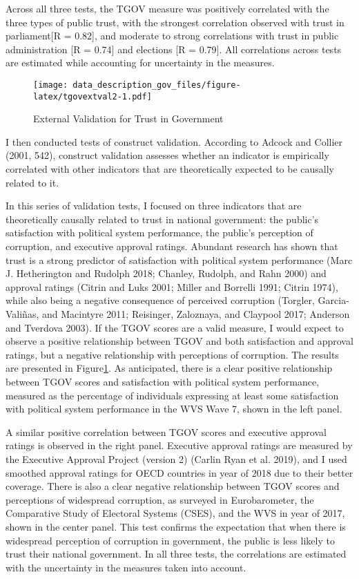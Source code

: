 \documentclass[
  12pt,
]{article}
\begin{document}
Across all three tests, the TGOV measure was positively correlated with the three types of public trust, with the strongest correlation observed with trust in parliament{[}R = 0.82{]}, and moderate to strong correlations with trust in public administration {[}R = 0.74{]} and elections {[}R = 0.79{]}.
All correlations across tests are estimated while accounting for uncertainty in the measures.

\begin{figure}
\centering
\texttt{[image: data\_description\_gov\_files/figure-latex/tgovextval2-1.pdf]}
\caption{\label{fig:tgovextval2}External Validation for Trust in Government \label{tgov_ev2}}
\end{figure}

I then conducted tests of construct validation.
According to Adcock and Collier (2001, 542), construct validation assesses whether an indicator is empirically correlated with other indicators that are theoretically expected to be causally related to it.

In this series of validation tests, I focused on three indicators that are theoretically causally related to trust in national government: the public's satisfaction with political system performance, the public's perception of corruption, and executive approval ratings.
Abundant research has shown that trust is a strong predictor of satisfaction with political system performance (Marc J. Hetherington and Rudolph 2018; Chanley, Rudolph, and Rahn 2000) and approval ratings (Citrin and Luks 2001; Miller and Borrelli 1991; Citrin 1974), while also being a negative consequence of perceived corruption (Torgler, Garcia-Valiñas, and Macintyre 2011; Reisinger, Zaloznaya, and Claypool 2017; Anderson and Tverdova 2003).
If the TGOV scores are a valid measure, I would expect to observe a positive relationship between TGOV and both satisfaction and approval ratings, but a negative relationship with perceptions of corruption.
The results are presented in Figure\nobreakspace{}\ref{tgov_ev2}.
As anticipated, there is a clear positive relationship between TGOV scores and satisfaction with political system performance, measured as the percentage of individuals expressing at least some satisfaction with political system performance in the WVS Wave 7, shown in the left panel.

A similar positive correlation between TGOV scores and executive approval ratings is observed in the right panel.
Executive approval ratings are measured by the Executive Approval Project (version 2) (Carlin Ryan et al. 2019), and I used smoothed approval ratings for OECD countries in year of 2018 due to their better coverage.
There is also a clear negative relationship between TGOV scores and perceptions of widespread corruption, as surveyed in Eurobarometer, the Comparative Study of Electoral Systems (CSES), and the WVS in year of 2017, shown in the center panel.
This test confirms the expectation that when there is widespread perception of corruption in government, the public is less likely to trust their national government.
In all three tests, the correlations are estimated with the uncertainty in the measures taken into account.
\end{document}
